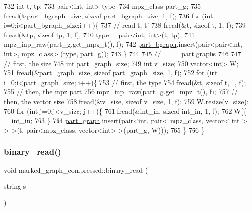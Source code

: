 \begin{DoxyCode}
732   \textcolor{keywordtype}{int} t, tp;
733   pair<int, int> type; 
734   mpz\_class part\_g; 
735   fread(&part\_bgraph\_size, \textcolor{keyword}{sizeof} part\_bgraph\_size, 1, f);
736   \textcolor{keywordflow}{for} (\textcolor{keywordtype}{int} i=0;i<part\_bgraph\_size;i++)\{
737     \textcolor{comment}{// read t, t'}
738     fread(&t, \textcolor{keyword}{sizeof} t, 1, f);
739     fread(&tp, \textcolor{keyword}{sizeof} tp, 1, f);
740     type = pair<int, int>(t, tp);
741     mpz\_inp\_raw(part\_g.get\_mpz\_t(), f);
742     \hyperlink{classmarked__graph__compressed_a7b3267063fba30b45eb21b3ba4e07536}{part\_bgraph}.insert(pair<pair<int, int>, mpz\_class> (type, part\_g));
743   \}
744 
745   \textcolor{comment}{// === part graphs}
746 
747   \textcolor{comment}{// first, the size}
748   \textcolor{keywordtype}{int} part\_graph\_size;
749   \textcolor{keywordtype}{int} v\_size;
750   vector<int> W; 
751   fread(&part\_graph\_size, \textcolor{keyword}{sizeof} part\_graph\_size, 1, f);
752   \textcolor{keywordflow}{for} (\textcolor{keywordtype}{int} i=0;i<part\_graph\_size; i++)\{
753     \textcolor{comment}{// first, the type}
754     fread(&t, \textcolor{keyword}{sizeof} t, 1, f);
755     \textcolor{comment}{// then, the mpz part}
756     mpz\_inp\_raw(part\_g.get\_mpz\_t(), f);
757     \textcolor{comment}{// then, the vector size}
758     fread(&v\_size, \textcolor{keyword}{sizeof} v\_size, 1, f);
759     W.resize(v\_size);
760     \textcolor{keywordflow}{for} (\textcolor{keywordtype}{int} j=0;j<v\_size; j++)\{
761       fread(&int\_in, \textcolor{keyword}{sizeof} int\_in, 1, f);
762       W[j] = int\_in;
763     \}
764     \hyperlink{classmarked__graph__compressed_ae179a4737e6eab905c18a94d44ef64b7}{part\_graph}.insert(pair<\textcolor{keywordtype}{int}, pair< mpz\_class, vector< int > > >(t, pair<mpz\_class, vector<int>
       >(part\_g, W)));
765   \}
766 \}
\end{DoxyCode}
\mbox{\label{classmarked__graph__compressed_a01c67fe4234738db6bb60459515c3ad8}} 
\subsubsection{\texorpdfstring{binary\+\_\+read()}{binary\_read()}\hspace{0.1cm}{\footnotesize\ttfamily [2/2]}}
{\footnotesize\ttfamily void marked\+\_\+graph\+\_\+compressed\+::binary\+\_\+read (\begin{DoxyParamCaption}\item[{string}]{s }\end{DoxyParamCaption})}

